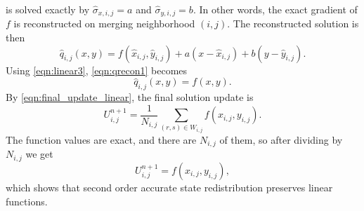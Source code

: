 is solved exactly by $\widehat{\sigma}_{x,i,j}=a$ and
$\widehat{\sigma}_{y,i,j}=b$.  In other words, the exact gradient 
of $f$ is reconstructed on merging neighborhood $(i,j)$.  
The reconstructed solution is then
\begin{equation}
    \label{eqn:qrecon1}
    \hat{q}_{i,j}(x,y) = f(\widehat{x}_{i,j},\widehat{y}_{i,j}) + a(x-\widehat{x}_{i,j})+b(y-\widehat{y}_{i,j}) .
\end{equation}
Using \eqref{eqn:linear3}, \eqref{eqn:qrecon1} becomes
\begin{equation}
    \label{eqn:qrecon2}
    \hat{q}_{i,j}(x,y) = f(x,y).
\end{equation}
By \eqref{eqn:final_update_linear}, the final solution update is
\begin{equation} 
U^{n+1}_{i,j} = \frac{1}{N_{i,j}}\sum_{(r,s) \in W_{i,j}}f(x_{i,j},y_{i,j}).
\end{equation}
The function values are exact, and there are $N_{i,j}$ of them, so
after dividing by $N_{i,j}$ we get
\begin{equation} 
U^{n+1}_{i,j} = f(x_{i,j},y_{i,j}),
\end{equation}
which shows that second order accurate state redistribution preserves linear functions.



